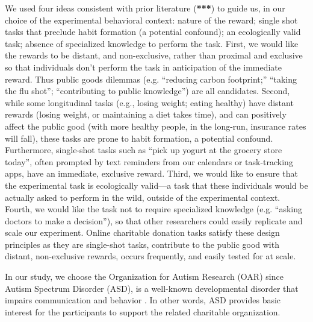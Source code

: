 We used four ideas consistent with prior literature (\textbf{***}) to guide us, in our choice of the experimental behavioral context: nature of the reward; single shot tasks that preclude habit formation (a potential confound); an ecologically valid task; absence of specialized knowledge to perform the task. First, we would like the rewards to be distant, and non-exclusive, rather than proximal and exclusive so that individuals don't perform the task in anticipation of the immediate reward. Thus public goods dilemmas (e.g. ``reducing carbon footprint;'' ``taking the flu shot''; ``contributing to public knowledge'') are all candidates. Second, while some longitudinal tasks (e.g., losing weight; eating healthy) have distant rewards (losing weight, or maintaining a diet takes time), and can positively affect the public good (with more healthy people, in the long-run, insurance rates will fall), these tasks are prone to habit formation, a potential confound. Furthermore, single-shot tasks such as ``pick up yogurt at the grocery store today'', often prompted by text reminders from our calendars or task-tracking apps, have an immediate, exclusive reward. Third, we would like to ensure that the experimental task is ecologically valid---a task that these individuals would be actually asked to perform in the wild, outside of the experimental context. Fourth, we would like the task not to require specialized knowledge (e.g. ``asking doctors to make a decision''), so that other researchers could easily replicate and scale our experiment. Online charitable donation tasks satisfy these design principles as they are single-shot tasks, contribute to the public good with distant, non-exclusive rewards, occurs frequently, and easily tested for at scale. 

In our study, we choose the Organization for Autism Research (OAR) since Autism Spectrum Disorder (ASD), is a well-known developmental disorder that impairs communication and behavior \cite{american2013diagnostic}. In other words, ASD provides basic interest for the participants to support the related charitable organization. 





